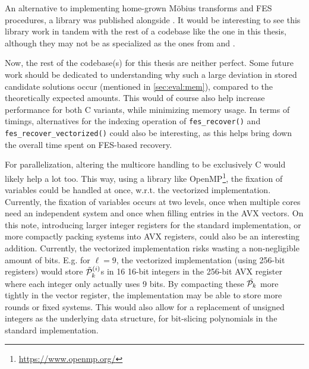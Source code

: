 An alternative to implementing home-grown Möbius transforms and FES procedures, a library was published alongside \cite{cryptoeprint:2022/1412}. It would be interesting to see this library work in tandem with the rest of a codebase like the one in this thesis, although they may not be as specialized as the ones from \cite{ches-2010-23990} and \cite{cryptoeprint:2013/436}.

Now, the rest of the codebase(s) for this thesis are neither perfect. Some future work should be dedicated to understanding why such a large deviation in stored candidate solutions occur (mentioned in \cref{sec:eval:mem}), compared to the theoretically expected amounts. This would of course also help increase performance for both C variants, while minimizing memory usage. In terms of timings, alternatives for the indexing operation of \texttt{fes\_recover()} and \texttt{fes\_recover\_vectorized()} could also be interesting, as this helps bring down the overall time spent on FES-based recovery. 

For parallelization, altering the multicore handling to be exclusively C would likely help a lot too. This way, using a library like OpenMP\footnote{\url{https://www.openmp.org/}}, the fixation of variables could be handled at once, w.r.t. the vectorized implementation. Currently, the fixation of variables occurs at two levels, once when multiple cores need an independent system and once when filling entries in the AVX vectors. On this note, introducing larger integer registers for the standard implementation, or more compactly packing systems into AVX registers, could also be an interesting addition. Currently, the vectorized implementation risks wasting a non-negligible amount of bits. E.g. for $\ell = 9$, the vectorized implementation (using 256-bit registers) would store $\Tilde{\mathcal{P}}^{(i)}_k$s in 16 16-bit integers in the 256-bit AVX register where each integer only actually uses 9 bits. By compacting these $\Tilde{\mathcal{P}_k}$ more tightly in the vector register, the implementation may be able to store more rounds or fixed systems. This would also allow for a replacement of unsigned integers as the underlying data structure, for bit-slicing polynomials in the standard implementation.